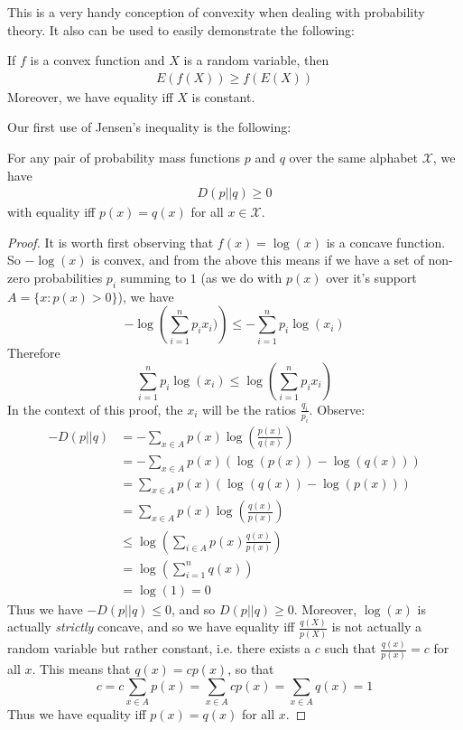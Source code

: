 This is a very handy conception of convexity when dealing with probability theory. It also can be used to easily demonstrate the following:
\begin{theorem}
	If $f$ is a convex function and $X$ is a random variable, then 
\begin{align}
	E(f(X)) \geq f(E(X))
\end{align}
Moreover, we have equality iff $X$ is constant.
\end{theorem}
Our first use of Jensen's inequality is the following:
\begin{theorem}
	For any pair of probability mass functions $p$ and $q$ over the same alphabet $\mathcal{X}$, we have
	\begin{align}
		D(p||q) \geq 0
	\end{align}
with equality iff $p(x) = q(x)$ for all $x \in \mathcal{X}$. 
\end{theorem}
\begin{proof}
	It is worth first observing that $f(x) = \log(x)$ is a concave function. So $-\log(x)$ is convex, and from the above this means if we have a set of non-zero probabilities $p_i$ summing to $1$ (as we do with $p(x)$ over it's support $A = \{x: p(x) > 0\}$), we have 
	\[ -\log\left(\sum_{i=1}^n p_ix_i) \right) \leq -\sum_{i=1}^n p_i \log(x_i) \]
Therefore 
	\[ \sum_{i=1}^n p_i \log(x_i) \leq \log\left( \sum_{i=1}^n p_ix_i \right) \]
	In the context of this proof, the $x_i$ will be the ratios $\frac{q_i}{p_i}$. Observe:
\begin{align}
	-D(p||q) &= -\sum_{x \in A} p(x)\log\left(\frac{p(x)}{q(x)}\right) \\
		&= -\sum_{x \in A} p(x) (\log(p(x)) - \log(q(x))) \\
		&= \sum_{x \in A} p(x) (\log(q(x)) - \log(p(x))) \\
		&= \sum_{x \in A} p(x) \log\left( \frac{q(x)}{p(x)} \right) \\
		&\leq \log\left( \sum_{i \in A} p(x)\frac{q(x)}{p(x)} \right) \\
		&= \log\left( \sum_{i=1}^n q(x) \right) \\
		&= \log(1) = 0
\end{align}
Thus we have $-D(p||q) \leq 0$, and so $D(p||q) \geq 0$. Moreover, $\log(x)$ is actually \emph{strictly} concave, and so we have equality iff $\frac{q(X)}{p(X)}$ is not actually a random variable but rather constant, i.e. there exists a $c$ such that $\frac{q(x)}{p(x)} = c$ for all $x$. This means that $q(x) = cp(x)$, so that 
\[ c = c\sum_{x \in A}p(x) = \sum_{x \in A} cp(x) = \sum_{x \in A} q(x) = 1 \]
Thus we have equality iff $p(x) = q(x)$ for all $x$. 
\end{proof}
